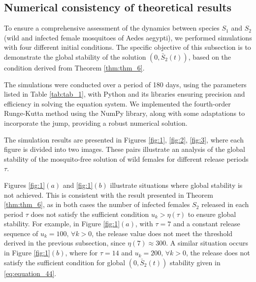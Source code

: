 \documentclass[10pt,letterpaper]{article}
\begin{document}
\subsection{Numerical consistency of theoretical results}

To ensure a comprehensive assessment of the dynamics between species $S_1$ and $S_2$ (wild and infected female mosquitoes of Aedes aegypti), we performed simulations with four different initial conditions. The specific objective of this subsection is to demonstrate the global stability of the solution $(0, \bar{S}_2(t))$, based on the condition derived from Theorem \eqref{thm:thm_6}.

The simulations were conducted over a period of 180 days, using the parameters listed in Table \eqref{tab:tab_1}, with Python and its libraries ensuring precision and efficiency in solving the equation system. We implemented the fourth-order Runge-Kutta method using the NumPy library, along with some adaptations to incorporate the jump, providing a robust numerical solution.

The simulation results are presented in Figures \eqref{fig:1}, \eqref{fig:2}, \eqref{fig:3}, where each figure is divided into two images. These pairs illustrate an analysis of the global stability of the mosquito-free solution of wild females for different release periods $\tau$.

Figures \eqref{fig:1}$(a)$ and \eqref{fig:1}$(b)$ illustrate situations where global stability is not achieved. This is consistent with the result presented in Theorem \eqref{thm:thm_6}, as in both cases the number of infected females $S_2$ released in each period $\tau$ does not satisfy the sufficient condition $u_k > \eta(\tau)$ to ensure global stability. For example, in Figure \eqref{fig:1}$(a)$, with $\tau = 7$ and a constant release sequence of $u_k = 100, \, \forall k > 0$, the release value does not meet the threshold derived in the previous subsection, since $\eta(7) \approx 300$. A similar situation occurs in Figure \eqref{fig:1}$(b)$, where for $\tau = 14$ and $u_k = 200, \, \forall k > 0$, the release does not satisfy the sufficient condition for global $(0, \bar{S}_2(t))$ stability given in \eqref{eq:equation_44}.
\end{document}
